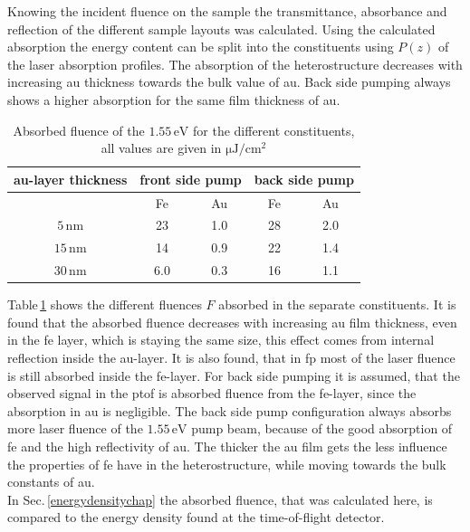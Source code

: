 \documentclass[a4paper,12pt,twoside]{article}
\begin{document}
\noindent
Knowing the incident fluence on the sample the transmittance, absorbance and reflection of the different sample layouts was calculated. Using the calculated absorption the energy content can be split into the constituents using $P(z)$ of the laser absorption profiles. The absorption of the heterostructure decreases with increasing \gls{au} thickness towards the bulk value of \gls{au}. Back side pumping always shows a higher absorption for the same film thickness of \gls{au}.
	\begin{table}[H]
	    \centering
		\caption{Absorbed fluence of the $1.55\,\mathrm{eV}$ for the different constituents, all values are given in $\mathrm{{\mu J/cm^{2}}}$ }
		\vspace{4mm}
		\begin{tabular}{ccc|cc}
			\gls{au}-layer thickness & \multicolumn{2}{c|}{front side pump}&\multicolumn{2}{c}{back side pump} \\
			\hline
			&Fe&Au&Fe&Au \\
			$5\,\mathrm{\mbox{nm}}$ & 23 & 1.0 & 28 & 2.0 \\
			$15\,\mathrm{\mbox{nm}}$ & 14 &0.9 & 22 & 1.4\\
			$30\,\mathrm{\mbox{nm}}$ & 6.0 & 0.3 & 16 & 1.1\\
		\end{tabular}
    		\label{absorption}
	\end{table}
	
	
Table\,\ref{absorption} shows the different fluences $F$ absorbed in the separate constituents. It is found that the absorbed fluence decreases with increasing \gls{au} film thickness, even in the \gls{fe} layer, which is staying the same size, this effect comes from internal reflection inside the \gls{au}-layer. It is also found, that in \gls{fp} most of the laser fluence is still absorbed inside the \gls{fe}-layer. For back side pumping it is assumed, that the observed signal in the \gls{ptof} is absorbed fluence from the \gls{fe}-layer, since the absorption in \gls{au} is negligible. The back side pump configuration always absorbs more laser fluence of the $1.55\,\mathrm{eV}$ pump beam, because of the good absorption of \gls{fe} and the high reflectivity of \gls{au}. The thicker the \gls{au} film gets the less influence the properties of \gls{fe} have in the heterostructure, while moving towards the bulk constants of \gls{au}.\\ \noindent
In Sec.\,\ref{energydensitychap} the absorbed fluence, that was calculated here, is compared to the energy density found at the time-of-flight detector.
\end{document}
